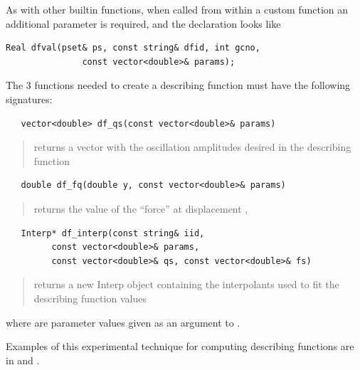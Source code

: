 As with other builtin functions, when called from within a custom
function an additional parameter is required, and the declaration looks
like
\begin{lstlisting}
Real dfval(pset& ps, const string& dfid, int gcno,
               const vector<double>& params);
\end{lstlisting}

The 3 functions needed to create a describing function
must have the following signatures:
\begin{lstlisting}
   vector<double> df_qs(const vector<double>& params)
\end{lstlisting}
\begin{quote}
returns a vector with the oscillation amplitudes desired in the describing function
\end{quote}
\begin{lstlisting}
   double df_fq(double y, const vector<double>& params)
\end{lstlisting}
\begin{quote}
returns the value of the ``force'' at displacement ,
\end{quote}
\begin{lstlisting}
   Interp* df_interp(const string& iid,
         const vector<double>& params,
         const vector<double>& qs, const vector<double>& fs)
\end{lstlisting}
\begin{quote}
returns a new Interp object containing the interpolants used to fit the
describing function values 
\end{quote}
where  are parameter values given as an argument to .

Examples of this experimental technique for computing describing
functions are in   and 
.
